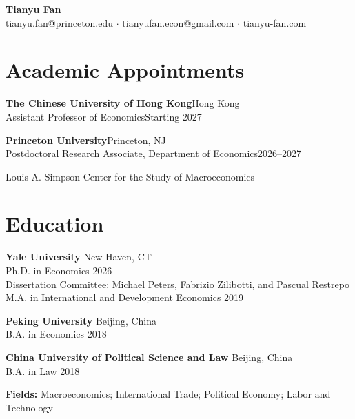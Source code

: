 \documentclass[10pt,letterpaper]{article}
\newcommand{\cventry}[4]{\textbf{#1}\hfill #2\\#3\hfill #4\par}
\begin{document}
\begin{center}
    {\LARGE \textbf{Tianyu Fan}} \\[6pt]

    \href{mailto:tianyu.fan@princeton.edu}{tianyu.fan@princeton.edu} $\cdot$
    \href{mailto:tianyufan.econ@gmail.com}{tianyufan.econ@gmail.com} $\cdot$
    \href{https://www.tianyu-fan.com}{tianyu-fan.com}
\end{center}

\vspace{6pt}

\section*{Academic Appointments}

\cventry{The Chinese University of Hong Kong}{Hong Kong}
    {Assistant Professor of Economics}{Starting 2027}

\vspace{4pt}

\cventry{Princeton University}{Princeton, NJ}
    {Postdoctoral Research Associate, Department of Economics}{2026--2027}
Louis A. Simpson Center for the Study of Macroeconomics

\section*{Education}

\textbf{Yale University} \hfill New Haven, CT \\
Ph.D. in Economics \hfill 2026 \\
Dissertation Committee: Michael Peters, Fabrizio Zilibotti, and Pascual Restrepo \\
M.A. in International and Development Economics \hfill 2019

\vspace{6pt}

\textbf{Peking University} \hfill Beijing, China \\
B.A. in Economics \hfill 2018

\vspace{6pt}

\textbf{China University of Political Science and Law} \hfill Beijing, China \\
B.A. in Law \hfill 2018

\vspace{8pt}
\textbf{Fields:} Macroeconomics; International Trade; Political Economy; Labor and Technology
\end{document}
